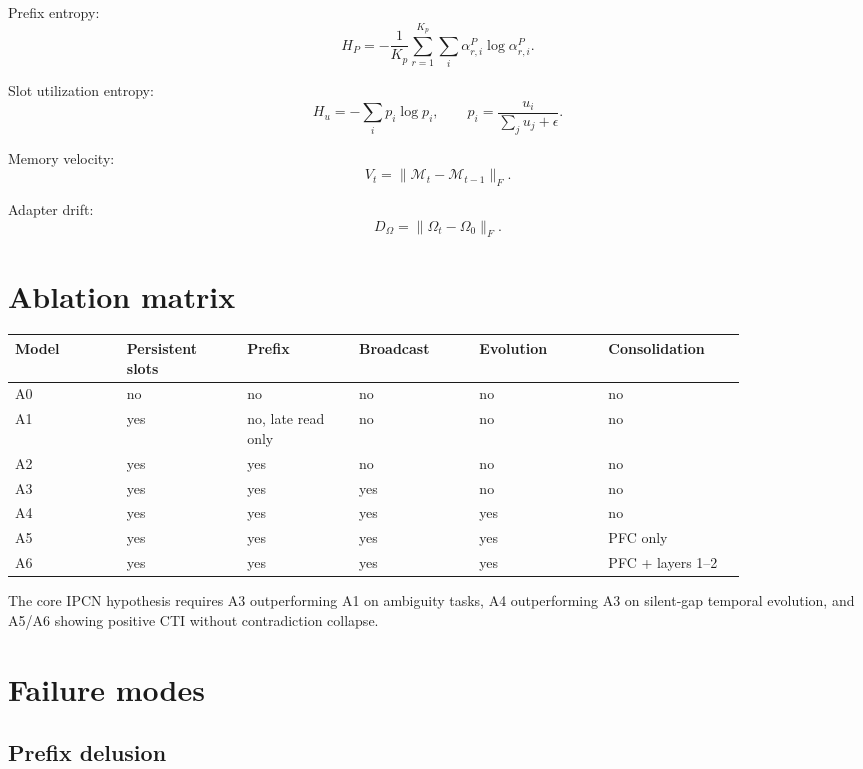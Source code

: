 \documentclass[11pt]{article}
\newcommand{\Mem}{\mathcal{M}}
\begin{document}
Prefix entropy:
\begin{equation}
    H_P=-\frac{1}{K_p}\sum_{r=1}^{K_p}\sum_i\alpha_{r,i}^{P}\log\alpha_{r,i}^{P}.
\end{equation}

Slot utilization entropy:
\begin{equation}
    H_u=-\sum_i p_i\log p_i,\qquad p_i=\frac{u_i}{\sum_j u_j+\epsilon}.
\end{equation}

Memory velocity:
\begin{equation}
    V_t=\|\Mem_t-\Mem_{t-1}\|_F.
\end{equation}

Adapter drift:
\begin{equation}
    D_\Omega=\|\Omega_t-\Omega_0\|_F.
\end{equation}

\section{Ablation matrix}

\begin{longtable}{p{0.13\linewidth}p{0.14\linewidth}p{0.13\linewidth}p{0.14\linewidth}p{0.15\linewidth}p{0.16\linewidth}}
\toprule
\textbf{Model} & \textbf{Persistent slots} & \textbf{Prefix} & \textbf{Broadcast} & \textbf{Evolution} & \textbf{Consolidation}\\
\midrule
A0 & no & no & no & no & no\\
A1 & yes & no, late read only & no & no & no\\
A2 & yes & yes & no & no & no\\
A3 & yes & yes & yes & no & no\\
A4 & yes & yes & yes & yes & no\\
A5 & yes & yes & yes & yes & PFC only\\
A6 & yes & yes & yes & yes & PFC + layers 1--2\\
\bottomrule
\end{longtable}

The core IPCN hypothesis requires A3 outperforming A1 on ambiguity tasks, A4 outperforming A3 on silent-gap temporal evolution, and A5/A6 showing positive CTI without contradiction collapse.

\section{Failure modes}

\subsection{Prefix delusion}
\end{document}
